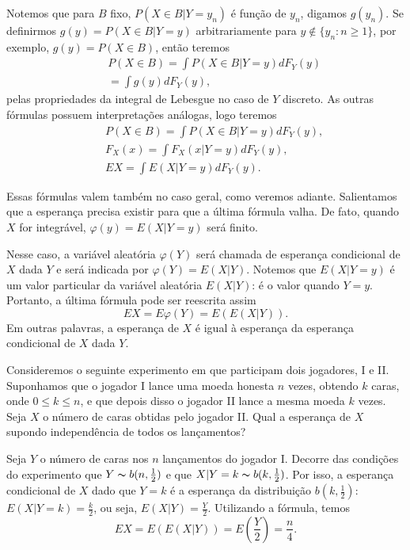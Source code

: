 \begin{frame}
\begin{block}{}


Notemos que para $B$ fixo, $P(X\in B|Y=y_n)$ é função de $y_n$,
digamos $g(y_n)$. Se definirmos $g(y)=P(X\in B|Y=y)$ arbitrariamente
para $y\notin \{y_n:n\geq 1\}$, por exemplo, $g(y)=P(X\in B)$, então
teremos
\begin{eqnarray}
& & P(X\in B)=\int P(X\in B|Y=y)dF_Y(y)
\nonumber\\
& & =\int g(y)dF_Y(y),
\nonumber \end{eqnarray}
pelas propriedades da integral de Lebesgue no caso de $Y$ discreto.
As outras fórmulas possuem interpretações análogas, logo teremos
\begin{eqnarray}
& & P(X\in B)=\int P(X\in B|Y=y)dF_Y(y),
\nonumber \\
& & F_X(x)=\int F_X(x|Y=y)dF_Y(y), \nonumber \\
& & EX=\int E(X|Y=y)dF_Y(y). \nonumber
\end{eqnarray}
\end{block}
Essas fórmulas valem também no caso geral, como veremos adiante.
Salientamos que a esperança precisa existir para que a última
fórmula valha. De fato, quando $X$ for integrável,
$\varphi(y)=E(X|Y=y)$ será finito.
\end{frame}

\begin{frame}
\begin{block}{}
Nesse caso, a variável aleatória
$\varphi(Y)$ será chamada de esperança condicional de $X$ dada $Y$ e
será indicada por $\varphi(Y)=E(X|Y)$. Notemos que $E(X|Y=y)$ é um
valor particular da variável aleatória $E(X|Y)$: é o valor quando
$Y=y$. Portanto, a última fórmula pode ser reescrita assim
$$EX=E\varphi(Y)=E(E(X|Y)).$$
Em outras palavras, a esperança de $X$ é igual à esperança da
esperança condicional de $X$ dada $Y$.
\end{block}

\begin{exem}
Consideremos o seguinte experimento em que participam dois
jogadores, I e II. Suponhamos que o jogador I lance uma moeda
honesta $n$ vezes, obtendo $k$ caras, onde $0\leq k\leq n$, e que
depois disso o jogador II lance a mesma moeda $k$ vezes. Seja $X$ o
número de caras obtidas pelo jogador II. Qual a esperança de $X$
supondo independência de todos os lançamentos?

Seja $Y$ o número de caras nos $n$ lançamentos do jogador I. Decorre
das condições do experimento que $Y \thicksim b(n,\frac{1}{2})$ e
que $X|Y=k \thicksim b(k,\frac{1}{2})$. Por isso, a esperança
condicional de $X$ dado que $Y=k$ é a esperança da distribuição
$b(k,\frac{1}{2})$: $E(X|Y=k)=\frac{k}{2}$, ou seja,
$E(X|Y)=\frac{Y}{2}$. Utilizando a fórmula, temos
$$EX=E(E(X|Y))=E(\frac{Y}{2})=\frac{n}{4}.$$
\end{exem}

\end{frame}

